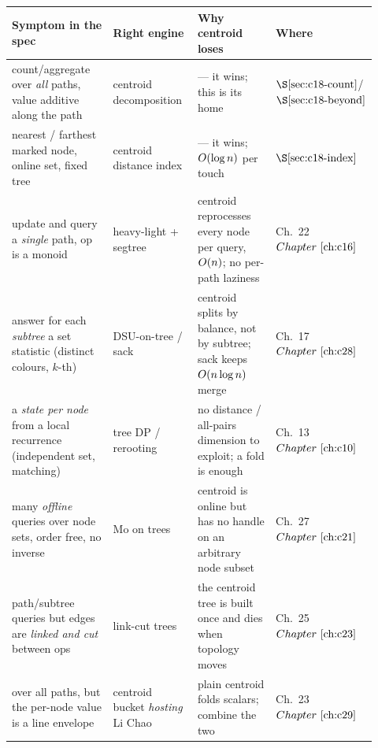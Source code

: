 \begin{center}
\small
\renewcommand{\arraystretch}{1.26}
\setlength{\tabcolsep}{4pt}
\begin{tabular}{@{}p{0.30\linewidth} p{0.24\linewidth} >{\raggedright\arraybackslash}p{0.24\linewidth} >{\centering\arraybackslash}p{0.14\linewidth}@{}}
\toprule
\textbf{Symptom in the spec} & \textbf{Right engine} & \textbf{Why centroid loses} & \textbf{Where}\\
\midrule
count/aggregate over \emph{all} paths, value additive along the path & centroid decomposition & --- it wins; this is its home & \(\secref{c18-count}\)/\(\secref{c18-beyond}\)\\
nearest / farthest marked node, online set, fixed tree & centroid distance index & --- it wins; \(O(\log n)\) per touch & \(\secref{c18-index}\)\\
update and query a \emph{single} path, op is a monoid & heavy-light + segtree & centroid reprocesses every node per query, \(O(n)\); no per-path laziness & Ch.~22 \(\chref{c16}\)\\
answer for each \emph{subtree} a set statistic (distinct colours, \(k\)-th) & DSU-on-tree / sack & centroid splits by balance, not by subtree; sack keeps \(O(n\log n)\) merge & Ch.~17 \(\chref{c28}\)\\
a \emph{state per node} from a local recurrence (independent set, matching) & tree DP / rerooting & no distance / all-pairs dimension to exploit; a fold is enough & Ch.~13 \(\chref{c10}\)\\
many \emph{offline} queries over node sets, order free, no inverse & Mo on trees & centroid is online but has no handle on an arbitrary node subset & Ch.~27 \(\chref{c21}\)\\
path/subtree queries but edges are \emph{linked and cut} between ops & link-cut trees & the centroid tree is built once and dies when topology moves & Ch.~25 \(\chref{c23}\)\\
over all paths, but the per-node value is a line envelope & centroid bucket \emph{hosting} Li Chao & plain centroid folds scalars; combine the two & Ch.~23 \(\chref{c29}\)\\
\bottomrule
\end{tabular}
\end{center}

